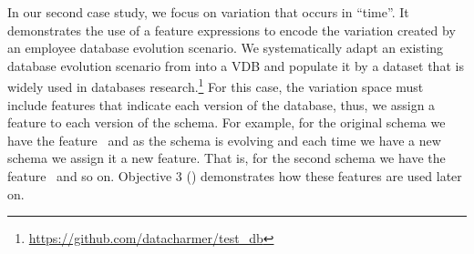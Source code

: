 In our second case study, we focus on variation that occurs in ``time''.
It demonstrates the use of a feature expressions to encode the variation created by
 an employee database evolution
scenario. We systematically adapt an existing database evolution scenario from
\citet{prima08Moon} into a VDB and populate it by a dataset that is widely used
in databases research.\footnote{\url{https://github.com/datacharmer/test_db}}
%
For this case, the variation space must include features that indicate
each version of the database, thus,
we assign a feature to each version of the schema.
For example, for the original schema we have the feature \vOne\ and
as the schema is evolving and each time we have a new schema we 
assign it a new feature. That is, for the second schema we have the 
feature \vTwo\ and so on. 
%
Objective 3 () demonstrates how these features are used later on.






